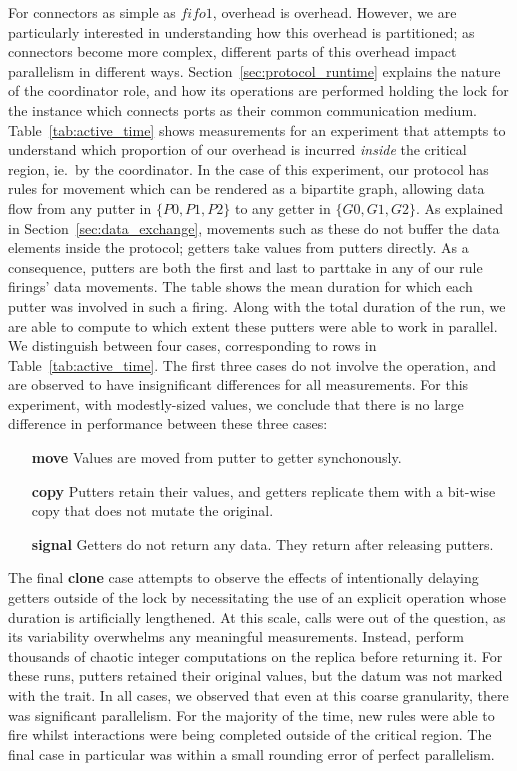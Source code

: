 For connectors as simple as $fifo1$, overhead is overhead. However, we are particularly interested in understanding how this overhead is partitioned; as connectors become more complex, different parts of this overhead impact parallelism in different ways. Section~\ref{sec:protocol_runtime} explains the nature of the coordinator role, and how its operations are performed holding the lock for the  instance which connects ports as their common communication medium. Table~\ref{tab:active_time} shows measurements for an experiment that attempts to understand which proportion of our overhead is incurred \textit{inside} the critical region, ie.\ by the coordinator. In the case of this experiment, our protocol has rules for movement which can be rendered as a bipartite graph, allowing data flow from any putter in $\{P0, P1, P2\}$ to any getter in $\{G0, G1, G2\}$. As explained in Section~\ref{sec:data_exchange}, movements such as these do not buffer the data elements inside the protocol; getters take values from putters directly. As a consequence, putters are both the first and last to parttake in any of our rule firings' data movements. The table shows the mean duration for which each putter was involved in such a firing. Along with the total duration of the run, we are able to compute to which extent these putters were able to work in parallel. We distinguish between four cases, corresponding to rows in Table~\ref{tab:active_time}. The first three cases do not involve the  operation, and are observed to have insignificant differences for all measurements. For this experiment, with modestly-sized values, we conclude that there is no large difference in performance between these three cases:
\begin{enumerate}
	\item [\textbf{move}] Values are moved from putter to getter synchonously.
	\item [\textbf{copy}] Putters retain their values, and getters replicate them with a bit-wise copy that does not mutate the original.
	\item [\textbf{signal}] Getters do not return any data. They return after releasing putters.
\end{enumerate}

The final \textbf{clone} case attempts to observe the effects of intentionally delaying getters outside of the lock by necessitating the use of an explicit  operation whose duration is artificially lengthened. At this scale,  calls were out of the question, as its variability overwhelms any meaningful measurements. Instead,  perform thousands of chaotic integer computations on the replica before returning it. For these runs, putters retained their original values, but the datum was not marked with the  trait. In all cases, we observed that even at this coarse granularity, there was significant parallelism. For the majority of the time, new rules were able to fire whilst interactions were being completed outside of the critical region. The final case in particular was within a small rounding error of perfect parallelism.

